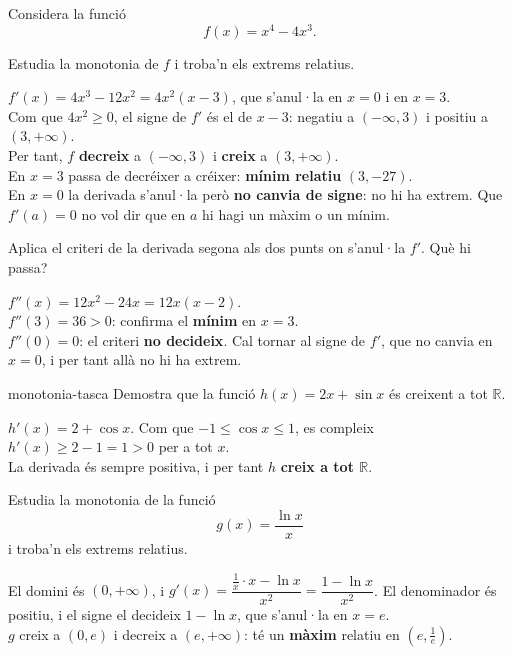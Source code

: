 Considera la funció
\[
f(x)=x^4-4x^3 .
\]

\begin{apartats}

Estudia la monotonia de $f$ i troba'n els extrems relatius.

\begin{solucio}
$f'(x)=4x^3-12x^2=4x^2(x-3)$, que s'anul·la en $x=0$ i en $x=3$.\\
Com que $4x^2\ge0$, el signe de $f'$ és el de $x-3$: negatiu a $(-\infty,3)$ i positiu a
$(3,+\infty)$.\\
Per tant, $f$ \textbf{decreix} a $(-\infty,3)$ i \textbf{creix} a $(3,+\infty)$.\\
En $x=3$ passa de decréixer a créixer: \textbf{mínim relatiu} $(3,-27)$.\\
En $x=0$ la derivada s'anul·la però \textbf{no canvia de signe}: no hi ha extrem. Que
$f'(a)=0$ no vol dir que en $a$ hi hagi un màxim o un mínim.
\end{solucio}

\begin{nomesllarg}
Aplica el criteri de la derivada segona als dos punts on s'anul·la $f'$. Què hi passa?

\begin{solucio}
$f''(x)=12x^2-24x=12x(x-2)$.\\
$f''(3)=36>0$: confirma el \textbf{mínim} en $x=3$.\\
$f''(0)=0$: el criteri \textbf{no decideix}. Cal tornar al signe de $f'$, que no canvia en
$x=0$, i per tant allà no hi ha extrem.
\end{solucio}
\end{nomesllarg}

\begin{tria}{monotonia-tasca}
Demostra que la funció $h(x)=2x+\sin x$ és creixent a tot $\mathbb{R}$.

\begin{solucio}
$h'(x)=2+\cos x$. Com que $-1\le\cos x\le1$, es compleix $h'(x)\ge2-1=1>0$ per a tot $x$.\\
La derivada és sempre positiva, i per tant $h$ \textbf{creix a tot $\mathbb{R}$}.
\end{solucio}

Estudia la monotonia de la funció
\[
g(x)=\frac{\ln x}{x}
\]
i troba'n els extrems relatius.

\begin{solucio}
El domini és $(0,+\infty)$, i $g'(x)=\dfrac{\frac1x\cdot x-\ln x}{x^2}=\dfrac{1-\ln x}{x^2}$. El
denominador és positiu, i el signe el decideix $1-\ln x$, que s'anul·la en $x=e$.\\
$g$ creix a $(0,e)$ i decreix a $(e,+\infty)$: té un \textbf{màxim} relatiu en
$\left(e,\tfrac1e\right)$.
\end{solucio}
\end{tria}

\end{apartats}
